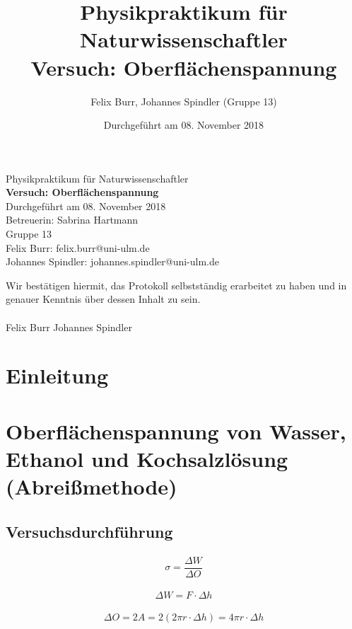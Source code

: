 \documentclass{scrartcl}
\title{Physikpraktikum für Naturwissenschaftler \\ Versuch: Oberflächenspannung}
\author{Felix Burr, Johannes Spindler (Gruppe 13)}
\date{Durchgeführt am 08. November 2018}
\begin{document}
\begin{titlepage}
  \begin{center}
    \vspace*{1cm}
    \LARGE
    Physikpraktikum für Naturwissenschaftler \\
    \vspace*{1cm}
    \Huge
    \textbf{Versuch: Oberflächenspannung} \\
    \vspace*{0.3cm}
    \Large
    Durchgeführt am 08. November 2018 \\
    Betreuerin: Sabrina Hartmann \\
    \vspace*{2.5cm}
    Gruppe 13 \\
    Felix Burr: felix.burr@uni-ulm.de \\
    Johannes Spindler: johannes.spindler@uni-ulm.de \\
    \vfill 
  \end{center}
  Wir bestätigen hiermit, das Protokoll selbstständig erarbeitet zu haben und in genauer Kenntnis über dessen Inhalt zu sein. \\
  \vspace*{0.8cm}
  \\
  Felix Burr
  \hfill
  Johannes Spindler
\end{titlepage}
\pagebreak
\tableofcontents


\pagebreak

\section{Einleitung}

\section{Oberflächenspannung von Wasser, Ethanol und Kochsalzlösung (Abreißmethode)}
\subsection{Versuchsdurchführung}
\begin{align}
\sigma = \dfrac{\Delta W}{\Delta O}
\end{align}

\begin{align}
\Delta W = F \cdot \Delta h
\end{align}

\begin{align}
\Delta O = 2A = 2(2 \pi r \cdot \Delta h) = 4 \pi r \cdot \Delta h
\end{align}
\end{document}
